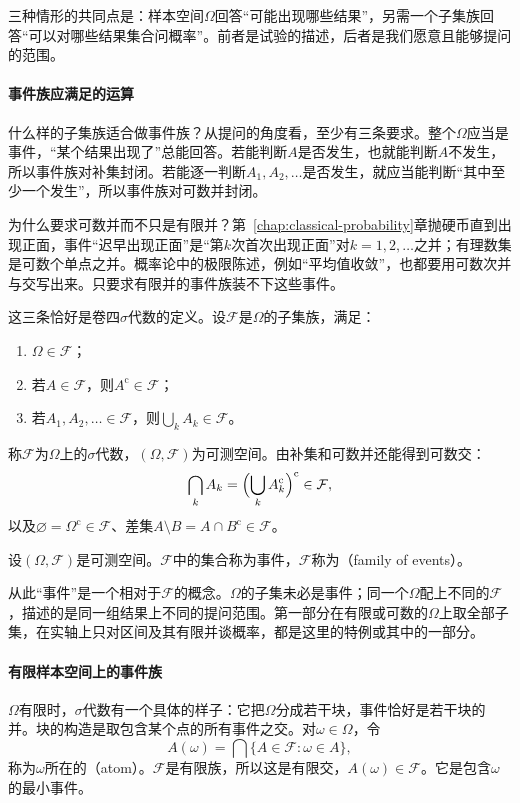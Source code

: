 三种情形的共同点是：样本空间$\Omega$回答“可能出现哪些结果”，另需一个子集族回答“可以对哪些结果集合问概率”。前者是试验的描述，后者是我们愿意且能够提问的范围。

\paragraph{事件族应满足的运算}
什么样的子集族适合做事件族？从提问的角度看，至少有三条要求。整个$\Omega$应当是事件，“某个结果出现了”总能回答。若能判断$A$是否发生，也就能判断$A$不发生，所以事件族对补集封闭。若能逐一判断$A_1,A_2,\dots$是否发生，就应当能判断“其中至少一个发生”，所以事件族对可数并封闭。

为什么要求可数并而不只是有限并？第~\ref{chap:classical-probability}章抛硬币直到出现正面，事件“迟早出现正面”是“第$k$次首次出现正面”对$k=1,2,\dots$之并；有理数集是可数个单点之并。概率论中的极限陈述，例如“平均值收敛”，也都要用可数次并与交写出来。只要求有限并的事件族装不下这些事件。

这三条恰好是卷四$\sigma$代数的定义。设$\mathcal{F}$是$\Omega$的子集族，满足：
\begin{enumerate}
  \item $\Omega\in\mathcal{F}$；
  \item 若$A\in\mathcal{F}$，则$A^{\mathrm{c}}\in\mathcal{F}$；
  \item 若$A_1,A_2,\dots\in\mathcal{F}$，则$\bigcup_{k}A_k\in\mathcal{F}$。
\end{enumerate}
称$\mathcal{F}$为$\Omega$上的$\sigma$代数，$(\Omega,\mathcal{F})$为可测空间。由补集和可数并还能得到可数交：
\[
  \bigcap_{k}A_k=\Bigl(\bigcup_{k}A_k^{\mathrm{c}}\Bigr)^{\mathrm{c}}\in\mathcal{F},
\]
以及$\varnothing=\Omega^{\mathrm{c}}\in\mathcal{F}$、差集$A\setminus B=A\cap B^{\mathrm{c}}\in\mathcal{F}$。

\begin{definition}[事件]
\label{def:pspace-event}
设$(\Omega,\mathcal{F})$是可测空间。$\mathcal{F}$中的集合称为事件，$\mathcal{F}$称为（family of events）。
\end{definition}

从此“事件”是一个相对于$\mathcal{F}$的概念。$\Omega$的子集未必是事件；同一个$\Omega$配上不同的$\mathcal{F}$，描述的是同一组结果上不同的提问范围。第一部分在有限或可数的$\Omega$上取全部子集，在实轴上只对区间及其有限并谈概率，都是这里的特例或其中的一部分。

\paragraph{有限样本空间上的事件族}
$\Omega$有限时，$\sigma$代数有一个具体的样子：它把$\Omega$分成若干块，事件恰好是若干块的并。块的构造是取包含某个点的所有事件之交。对$\omega\in\Omega$，令
\begin{equation}
  A(\omega)=\bigcap\{A\in\mathcal{F}:\omega\in A\},
  \label{eq:pspace-atom}
\end{equation}
称为$\omega$所在的（atom）。$\mathcal{F}$是有限族，所以这是有限交，$A(\omega)\in\mathcal{F}$。它是包含$\omega$的最小事件。

